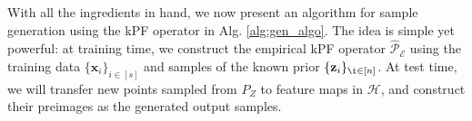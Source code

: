 

With all the ingredients in hand, we now present an algorithm for sample generation using the kPF operator in Alg. \ref{alg:gen_algo}. The idea is simple yet powerful: at training time, we construct the empirical kPF operator $\hat{\mathcal{P}}_{\mathcal{E}}$ using the training data $\{\mathbf{x}_i\}_{i \in [s]}$ and samples of the known prior $\{\mathbf{z}_i\}_{\i \in [n]}$. At test time, we will transfer new points sampled from $P_Z$ to feature maps in $\mathcal{H}$, and construct their preimages as the generated output samples.
    
    
